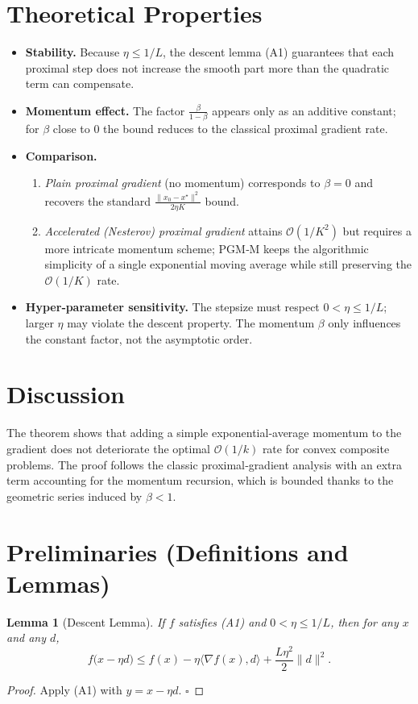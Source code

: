 \documentclass{article}
\newtheorem{lemma}{Lemma}
\newcommand{\grad}{\nabla}
\begin{document}
\section*{Theoretical Properties}
\begin{itemize}[leftmargin=*]
\item \textbf{Stability.} Because $\eta\le1/L$, the descent lemma (A1) guarantees that each
proximal step does not increase the smooth part more than the quadratic term can compensate.
\item \textbf{Momentum effect.} The factor $\frac{\beta}{1-\beta}$ appears only as an additive constant;
for $\beta$ close to $0$ the bound reduces to the classical proximal gradient rate.
\item \textbf{Comparison.}
    \begin{enumerate}
        \item \emph{Plain proximal gradient} (no momentum) corresponds to $\beta=0$ and recovers the standard $\frac{\|x_0-x^\star\|^2}{2\eta K}$ bound.
        \item \emph{Accelerated (Nesterov) proximal gradient} attains $\mathcal O(1/K^2)$ but requires a more intricate momentum scheme; PGM‑M keeps the algorithmic simplicity of a single exponential moving average while still preserving the $\mathcal O(1/K)$ rate.
    \end{enumerate}
\item \textbf{Hyper‑parameter sensitivity.}
    The stepsize must respect $0<\eta\le 1/L$; larger $\eta$ may violate the descent property.
    The momentum $\beta$ only influences the constant factor, not the asymptotic order.
\end{itemize}

\section*{Discussion}
The theorem shows that adding a simple exponential‑average momentum to the gradient does not deteriorate the optimal $\mathcal O(1/k)$ rate for convex composite problems.  The proof follows the classic proximal‑gradient analysis with an extra term accounting for the momentum recursion, which is bounded thanks to the geometric series induced by $\beta<1$.

\newpage
\section*{Preliminaries (Definitions and Lemmas)}
\begin{lemma}[Descent Lemma]\label{lem:descent}
If $f$ satisfies (A1) and $0<\eta\le1/L$, then for any $x$ and any $d$,
\[
f\bigl(x-\eta d\bigr)\le f(x)-\eta\langle\grad f(x),d\rangle+\frac{L\eta^{2}}{2}\|d\|^{2}.
\tag{L1}
\]
\end{lemma}
\begin{proof}
Apply (A1) with $y=x-\eta d$.  $\square$
\end{proof}
\end{document}
